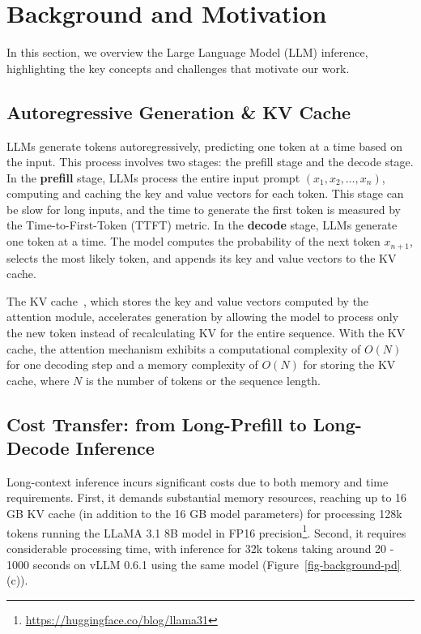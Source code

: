 
\section{Background and Motivation}
\label{sec-background}

In this section, we overview the Large Language Model (LLM) inference, highlighting the key concepts and challenges that motivate our work.

\subsection{Autoregressive Generation \& KV Cache}
%
LLMs generate tokens autoregressively, predicting one token at a time based on the input. 
This process involves two stages: the prefill stage and the decode stage.
%
In the \textbf{prefill} stage, LLMs process the entire input prompt $(x_1, x_2, \dots, x_n)$, 
computing and caching the key and value vectors for each token. This stage can be slow for long inputs, 
and the time to generate the first token is measured by the Time-to-First-Token (TTFT) metric.
%
In the \textbf{decode} stage, LLMs generate one token at a time. 
The model computes the probability of the next token $x_{n+1}$, 
selects the most likely token, and appends its key and value vectors to the KV cache. 

The KV cache~\cite{pope2023efficiently}, 
which stores the key and value vectors computed by the attention module, 
accelerates generation by allowing the model to process only the new token instead of recalculating KV for the entire sequence. With the KV cache, the attention mechanism exhibits a computational complexity of $O(N)$ for one decoding step and a memory complexity of $O(N)$ for storing the KV cache, where $N$ is the number of tokens or the sequence length.


\subsection{Cost Transfer: from Long-Prefill to Long-Decode Inference}



Long-context inference incurs significant costs due to both memory and time requirements. First, it demands substantial memory resources, reaching up to 16 GB KV cache (in addition to the 16 GB model parameters) for processing 128k tokens running the LLaMA 3.1 8B model in FP16 precision\footnote{\url{https://huggingface.co/blog/llama31}}. Second, it requires considerable processing time, with inference for 32k tokens taking around 20 - 1000 seconds on vLLM 0.6.1 using the same model (Figure~\ref{fig-background-pd} (c)).

